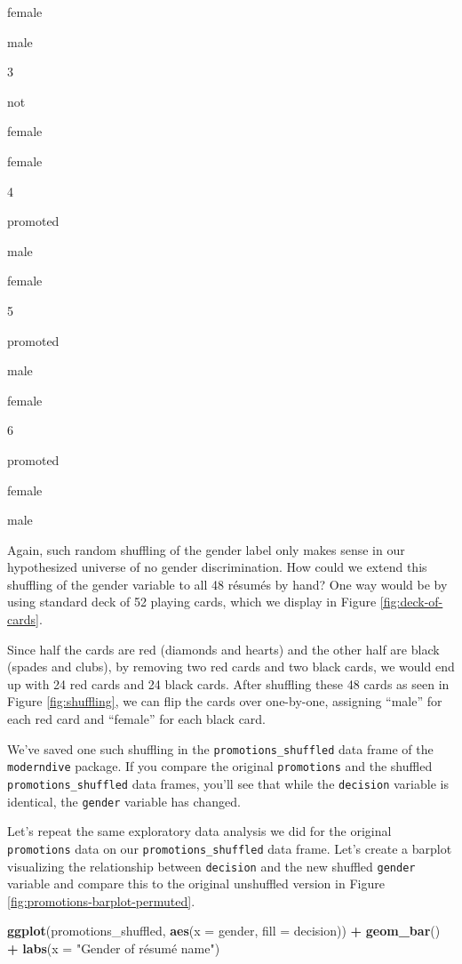 \documentclass[
]{book}
\newenvironment{Shaded}{\begin{snugshade}}{\end{snugshade}}
\newcommand{\DataTypeTok}[1]{\textcolor[rgb]{0.13,0.29,0.53}{#1}}
\newcommand{\KeywordTok}[1]{\textcolor[rgb]{0.13,0.29,0.53}{\textbf{#1}}}
\newcommand{\NormalTok}[1]{#1}
\newcommand{\OperatorTok}[1]{\textcolor[rgb]{0.81,0.36,0.00}{\textbf{#1}}}
\newcommand{\StringTok}[1]{\textcolor[rgb]{0.31,0.60,0.02}{#1}}
\begin{document}
female

male

3

not

female

female

4

promoted

male

female

5

promoted

male

female

6

promoted

female

male

Again, such random shuffling of the gender label only makes sense in our hypothesized universe of no gender discrimination. How could we extend this shuffling of the gender variable to all 48 résumés by hand? One way would be by using standard deck of 52 playing cards, which we display in Figure \ref{fig:deck-of-cards}.

Since half the cards are red (diamonds and hearts) and the other half are black (spades and clubs), by removing two red cards and two black cards, we would end up with 24 red cards and 24 black cards. After shuffling these 48 cards as seen in Figure \ref{fig:shuffling}, we can flip the cards over one-by-one, assigning ``male'' for each red card and ``female'' for each black card.

We've saved one such shuffling in the \texttt{promotions\_shuffled} data frame of the \texttt{moderndive} package. If you compare the original \texttt{promotions} and the shuffled \texttt{promotions\_shuffled} data frames, you'll see that while the \texttt{decision} variable is identical, the \texttt{gender} variable has changed.

Let's repeat the same exploratory data analysis we did for the original \texttt{promotions} data on our \texttt{promotions\_shuffled} data frame. Let's create a barplot visualizing the relationship between \texttt{decision} and the new shuffled \texttt{gender} variable and compare this to the original unshuffled version in Figure \ref{fig:promotions-barplot-permuted}.

\begin{Shaded}
\begin{Highlighting}[]
\KeywordTok{ggplot}\NormalTok{(promotions_shuffled, }
       \KeywordTok{aes}\NormalTok{(}\DataTypeTok{x =}\NormalTok{ gender, }\DataTypeTok{fill =}\NormalTok{ decision)) }\OperatorTok{+}
\StringTok{  }\KeywordTok{geom_bar}\NormalTok{() }\OperatorTok{+}\StringTok{ }
\StringTok{  }\KeywordTok{labs}\NormalTok{(}\DataTypeTok{x =} \StringTok{"Gender of résumé name"}\NormalTok{)}
\end{Highlighting}
\end{Shaded}
\end{document}
